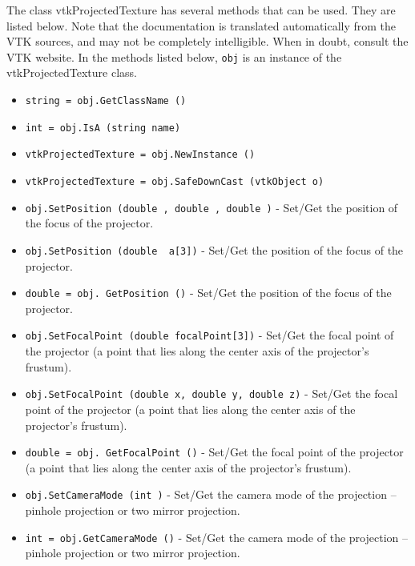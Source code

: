 The class vtkProjectedTexture has several methods that can be used.
  They are listed below.
Note that the documentation is translated automatically from the VTK sources,
and may not be completely intelligible.  When in doubt, consult the VTK website.
In the methods listed below, \verb|obj| is an instance of the vtkProjectedTexture class.
\begin{itemize}
\item  \verb|string = obj.GetClassName ()|

\item  \verb|int = obj.IsA (string name)|

\item  \verb|vtkProjectedTexture = obj.NewInstance ()|

\item  \verb|vtkProjectedTexture = obj.SafeDownCast (vtkObject o)|

\item  \verb|obj.SetPosition (double , double , double )| -  Set/Get the position of the focus of the projector.

\item  \verb|obj.SetPosition (double  a[3])| -  Set/Get the position of the focus of the projector.

\item  \verb|double = obj. GetPosition ()| -  Set/Get the position of the focus of the projector.

\item  \verb|obj.SetFocalPoint (double focalPoint[3])| -  Set/Get the focal point of the projector (a point that lies along
 the center axis of the projector's frustum).

\item  \verb|obj.SetFocalPoint (double x, double y, double z)| -  Set/Get the focal point of the projector (a point that lies along
 the center axis of the projector's frustum).

\item  \verb|double = obj. GetFocalPoint ()| -  Set/Get the focal point of the projector (a point that lies along
 the center axis of the projector's frustum).

\item  \verb|obj.SetCameraMode (int )| -  Set/Get the camera mode of the projection -- pinhole projection or
 two mirror projection.

\item  \verb|int = obj.GetCameraMode ()| -  Set/Get the camera mode of the projection -- pinhole projection or
 two mirror projection.


\end{itemize}
